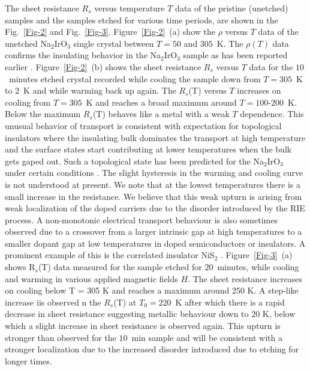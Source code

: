 \documentclass[aps,prb,twocolumn]{revtex4-1}
\begin{document}
The sheet resistance $R_s$ versus temperature $T$ data of the pristine (unetched) samples and the samples etched for various time periods, are shown in the Fig.~\ref{Fig-2} and Fig.~\ref{Fig-3}. Figure~\ref{Fig-2}~(a) show the $\rho$ versus $T$ data of the unetched Na$_{2}$IrO$ _{3}$ single crystal between $T = 50$ and $305$~K\@. The $\rho(T)$ data confirms the insulating behavior in the Na$_{2}$IrO$ _{3}$ sample as has been reported earlier \cite{Singh2010}. Figure~\ref{Fig-2}~(b) shows the sheet resistance $R_{s}$ versus $T$ data for the $10$~minutes etched crystal recorded while cooling the sample down from $T = 305$~K to $2$~K and while warming back up again. The $R_{s}$(T) versus $T$ increases on cooling from $T = 305$~K and reaches a broad maximum around $T = 100$-$200$~K\@. Below the maximum $R_{s}$(T) behaves like a metal with a weak $T$ dependence. This unusual behavior of transport is consistent with expectation for topological insulators where the insulating bulk dominates the transport at high temperature and the surface states start contributing at lower temperatures when the bulk gets gaped out. Such a topological state has been predicted for the Na$_{2}$IrO$_{3}$ under certain conditions \cite{Shitade2009, Kim2013}. The slight hysteresis in the warming and cooling curve is not understood at present.  We note that at the lowest temperatures there is a small increase in the resistance.  We believe that this weak upturn is arising from weak localization of the doped carriers due to the disorder introduced by the RIE process.  A non-monotonic electrical transport behaviour is also sometimes observed due to a crossover from a larger intrinsic gap at high temperatures to a smaller dopant gap at low temperatures in doped semiconductors or insulators.  A prominent example of this is the correlated insulator NiS$_2$ \cite{Yao1996}.  Figure~\ref{Fig-3}~(a) shows R$_{s}$(T) data measured for the sample etched for $20$~minutes, while cooling and warming in various applied magnetic fields $H$. The sheet resistance increases on cooling below T = 305 K and reaches a maximum around 250 K. A step-like increase iis observed n the $R_{s}$(T) at $T _{0} = 220$~K after which there is a rapid decrease in sheet resistance suggesting metallic behaviour down to 20 K, below which a slight increase in sheet resistance is observed again.  This upturn is stronger than observed for the $10$~min sample and will be consistent with a stronger localization due to the increased disorder introduced due to etching for longer times.  
\end{document}
